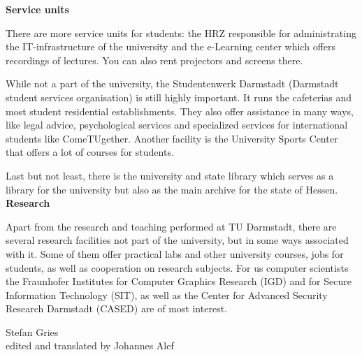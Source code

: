 {\textbf{Service units}

There are more service units for students: the HRZ responsible for administrating the IT-infrastructure of the university and the e-Learning center which offers recordings of lectures. You can also rent projectors and screens there.

While not a part of the university, the Studentenwerk Darmstadt (Darmstadt student services organisation) is still highly important. It runs the cafeterias and most student residential establishments. They also offer assistance in many ways, like legal advice, psychological services and specialized services for international students like ComeTUgether. Another facility is the University Sports Center that offers a lot of courses for students.

Last but not least, there is the university and state library which serves as a library for the university but also as the main archive for the state of Hessen.\\

\textbf{Research}

Apart from the research and teaching performed at TU Darmstadt, there are several research facilities not part of the university, but in some ways associated with it.
Some of them offer practical labs and other university courses, jobs for students, as well as cooperation on research subjects. For us computer scientists the Fraunhofer Institutes for Computer Graphics Research (IGD) and for Secure Information Technology (SIT), as well as the Center for Advanced Security Research Darmstadt (CASED) are of most interest.
}
{Stefan Gries\\ edited and translated by Johannes Alef}
